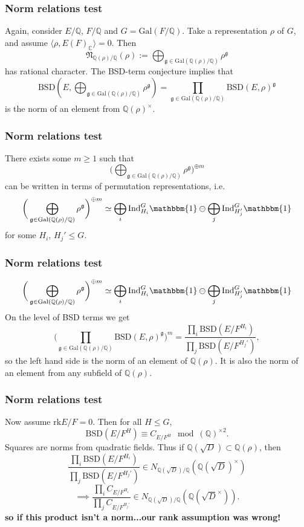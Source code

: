 \documentclass{beamer}
\newcommand{\Gal}{\mathrm{Gal}}
\newcommand{\BSD}{\mathrm{BSD}}
\newcommand{\rk}{\mathrm{rk}}
\newcommand{\trivial}{\mathbbm{1}}
\newcommand{\Ind}{\mathrm{Ind}}
\newcommand{\fg}{\mathfrak{g}}
\newcommand{\bQ}{\mathbb{Q}}
\newcommand{\bC}{\mathbb{C}}
\newcommand{\fN}{\mathfrak{N}}
\newcommand{\repnorm}[1]{\fN_{\bQ(#1) / \bQ}(#1)}
\theoremstyle{plain}
\begin{document}

\begin{frame}
    \frametitle{Norm relations test}
    Again, consider $E/ \bQ$, $F / \bQ$ and $G = \Gal(F / \bQ)$. \pause Take a representation $\rho$ of $G$, and assume $\langle \rho, E(F)_{\bC} \rangle = 0$. Then 
    $$ \repnorm{\rho} := \bigoplus_{\fg \in \Gal(\bQ(\rho) / \bQ)} \rho^{\fg}$$
    has rational character. \pause 
    The BSD-term conjecture implies that
    $$\BSD(E, \bigoplus_{\fg \in \Gal(\bQ(\rho) / \bQ)} \rho^{\fg}) = \prod_{\fg \in \Gal(\bQ(\rho) / \bQ)} \BSD(E, \rho)^{\fg}$$\pause
    is the norm of an element from $\bQ(\rho)^{\times}$. 
\end{frame}

\begin{frame}
    \frametitle{Norm relations test}
    There exists some $m \geq 1$ such that $$\bigg(\bigoplus_{\fg \in \Gal(\bQ(\rho) / \bQ)} \rho^{\fg}\bigg)^{\oplus m}$$
    can be written in terms of permutation representations, i.e. \pause
    $$  \bigg(\bigoplus_{\fg \in \Gal(\bQ(\rho) / \bQ)} \rho^{\fg}\bigg)^{\oplus m} \simeq \bigoplus_{i} \Ind_{H_i}^G \trivial \ominus \bigoplus_{j} \Ind_{H_j'}^G \trivial$$
    for some $H_i$, $H_j' \leq G$. 
\end{frame}

\begin{frame}
    \frametitle{Norm relations test}
    $$\bigg(\bigoplus_{\fg \in \Gal(\bQ(\rho) / \bQ)} \rho^{\fg}\bigg)^{\oplus m} \simeq \bigoplus_{i} \Ind_{H_i}^G \trivial \ominus \bigoplus_{j} \Ind_{H_j'}^G \trivial$$ \pause
    On the level of BSD terms we get
    $$\bigg(\prod_{\fg \in \Gal(\bQ(\rho) / \bQ)} \BSD(E, \rho)^{\fg}\bigg)^m = \frac{\prod_i \BSD(E / F^{H_i})}{\prod_j \BSD(E / F^{H_j'})} ,$$
    \pause so the left hand side is the norm of an element of $\bQ(\rho)$. \pause It is also the norm of an element from any subfield of $\bQ(\rho)$. 
\end{frame}

\begin{frame}
    \frametitle{Norm relations test}
    Now assume $\rk E / F = 0$. Then for all $H \leq G$, 
    $$ \BSD(E / F^{H}) \equiv C_{E / F^H} \mod (\bQ)^{\times 2}.$$ \pause
    Squares are norms from quadratic fields. \pause Thus if $\bQ(\sqrt{D}) \subset \bQ(\rho)$, then 
   $$\frac{\prod_i \BSD(E / F^{H_i})}{\prod_j \BSD(E / F^{H_j'})} \in N_{\bQ(\sqrt{D}) / \bQ}(\bQ(\sqrt{D})^{\times})$$ \pause $$\implies 
   \frac{\prod_i C_{E / F^{H_i}}}{\prod_j C_{E / F^{H_j'}}} \in N_{\bQ(\sqrt{D}) / \bQ}(\bQ(\sqrt{D}^{\times})). $$\pause
   \textbf{so if this product isn't a norm...\pause our rank assumption was wrong!}
\end{frame}
\end{document}
